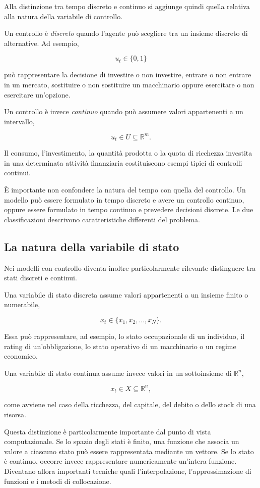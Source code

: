 \documentclass{book}
\begin{document}
Alla distinzione tra tempo discreto e continuo si aggiunge quindi quella relativa alla natura della variabile di controllo.

Un controllo è \emph{discreto} quando l'agente può scegliere tra un insieme discreto di alternative. Ad esempio,

$$
u_t\in\{0,1\}
$$

può rappresentare la decisione di investire o non investire, entrare o non entrare in un mercato, sostituire o non sostituire un macchinario oppure esercitare o non esercitare un'opzione.

Un controllo è invece \emph{continuo} quando può assumere valori appartenenti a un intervallo,

$$
u_t\in U\subseteq\mathbb{R}^m.
$$

Il consumo, l'investimento, la quantità prodotta o la quota di ricchezza investita in una determinata attività finanziaria costituiscono esempi tipici di controlli continui.

È importante non confondere la natura del tempo con quella del controllo. Un modello può essere formulato in tempo discreto e avere un controllo continuo, oppure essere formulato in tempo continuo e prevedere decisioni discrete. Le due classificazioni descrivono caratteristiche differenti del problema.

\subsection{La natura della variabile di stato}

Nei modelli con controllo diventa inoltre particolarmente rilevante distinguere tra stati discreti e continui.

Una variabile di stato discreta assume valori appartenenti a un insieme finito o numerabile,

$$
x_t\in\{x_1,x_2,\ldots,x_N\}.
$$

Essa può rappresentare, ad esempio, lo stato occupazionale di un individuo, il rating di un'obbligazione, lo stato operativo di un macchinario o un regime economico.

Una variabile di stato continua assume invece valori in un sottoinsieme di $\mathbb{R}^n$,

$$
x_t\in X\subseteq\mathbb{R}^n,
$$

come avviene nel caso della ricchezza, del capitale, del debito o dello stock di una risorsa.

Questa distinzione è particolarmente importante dal punto di vista computazionale. Se lo spazio degli stati è finito, una funzione che associa un valore a ciascuno stato può essere rappresentata mediante un vettore. Se lo stato è continuo, occorre invece rappresentare numericamente un'intera funzione. Diventano allora importanti tecniche quali l'interpolazione, l'approssimazione di funzioni e i metodi di collocazione.
\end{document}
